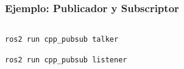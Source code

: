 \begin{frame}[fragile]
    \frametitle{Ejemplo: Publicador y Subscriptor}
    
    \begin{columns}
        \begin{column}{0.5\textwidth}
            
        \end{column}
        \begin{column}{0.5\textwidth}
            
        \end{column}
    \end{columns}
    
    \begin{lstlisting}[style=bash] 
ros2 run cpp_pubsub talker
    \end{lstlisting}

    \begin{lstlisting}[style=bash] 
ros2 run cpp_pubsub listener
    \end{lstlisting}
\end{frame}


